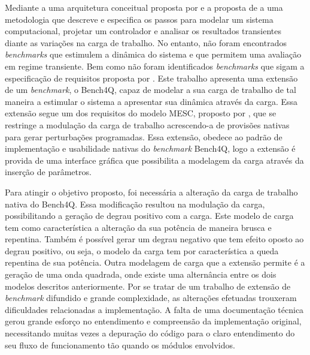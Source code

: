 Mediante a uma arquitetura conceitual proposta por  e a proposta de   a uma metodologia que descreve e especifica os passos para modelar um sistema computacional, projetar um controlador e analisar os resultados transientes diante as variações na carga de trabalho. No entanto, não foram encontrados \textit{benchmarks} que estimulem a dinâmica do sistema e que permitem uma avaliação em regime transiente. Bem como não foram identificados \textit{benchmarks} que sigam a especificação de requisitos proposta por .
Este trabalho apresenta uma extensão de um \textit{benchmark}, o Bench4Q, capaz de modelar a sua carga de trabalho de tal maneira a estimular o sistema a apresentar sua dinâmica através da carga. Essa extensão segue um dos requisitos do modelo MESC, proposto por , que se restringe a modulação da carga de trabalho acrescendo-a de provisões nativas para gerar perturbações programadas. Essa extensão, obedece ao padrão de implementação e usabilidade nativas do \textit{benchmark} Bench4Q, logo a extensão é provida de uma interface gráfica que possibilita a modelagem da carga através da inserção de parâmetros.

Para atingir o objetivo proposto, foi necessária a alteração da carga de trabalho nativa do Bench4Q. Essa modificação resultou na modulação da carga, possibilitando a geração de degrau positivo com a carga. Este modelo de carga tem como característica a alteração da sua potência de maneira brusca e repentina. Também é possível gerar um degrau negativo que tem efeito oposto ao degrau positivo, ou seja, o modelo da carga tem por característica a queda repentina de sua potência. Outra modelagem de carga que a extensão permite é a geração de uma onda quadrada, onde existe uma alternância entre os dois modelos descritos anteriormente. 
Por se tratar de um trabalho de extensão de \textit{benchmark} difundido e grande complexidade, as alterações efetuadas trouxeram dificuldades relacionadas a implementação. A falta de uma documentação técnica gerou grande esforço no entendimento e compreensão da implementação original, necessitando muitas vezes a depuração do código para o claro entendimento do seu fluxo de funcionamento tão quando os módulos envolvidos.

